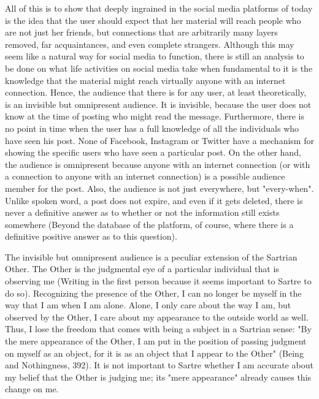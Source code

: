 All of this is to show that deeply ingrained in the social media platforms of today is the idea that the user should expect that her material will reach people who are not just her friends, but connections that are arbitrarily many layers removed, far acquaintances, and even complete strangers. Although this may seem like a natural way for social media to function, there is still an analysis to be done on what life activities on social media take when fundamental to it is the knowledge that the material might reach virtually anyone with an internet connection. Hence, the audience that there is for any user, at least theoretically, is an invisible but omnipresent audience. It is invisible, because the user does not know at the time of posting who might read the message. Furthermore, there is no point in time when the user has a full knowledge of all the individuals who have seen his post. None of Facebook, Instagram or Twitter have a mechanism for showing the specific users who have seen a particular post. On the other hand, the audience is omnipresent because anyone with an internet connection (or with a connection to anyone with an internet connection) is a possible audience member for the post. Also, the audience is not just everywhere, but "every-when". Unlike spoken word, a post does not expire, and even if it gets deleted, there is never a definitive answer as to whether or not the information still exists somewhere (Beyond the database of the platform, of course, where there is a definitive positive answer as to this question). 
 
The invisible but omnipresent audience is a peculiar extension of the Sartrian Other. The Other is the judgmental eye of a particular individual that is observing me (Writing in the first person because it seems important to Sartre to do so). Recognizing the presence of the Other, I can no longer be myself in the way that I am when I am alone. Alone, I only care about the way I am, but observed by the Other, I care about my appearance to the outside world as well. Thus, I lose the freedom that comes with being a subject in a Sartrian sense: "By the mere appearance of the Other, I am put in the position of passing judgment on myself as an object, for it is as an object that I appear to the Other" (Being and Nothingness, 392). It is not important to Sartre whether I am accurate about my belief that the Other is judging me; its "mere appearance" already causes this change on me.
 
